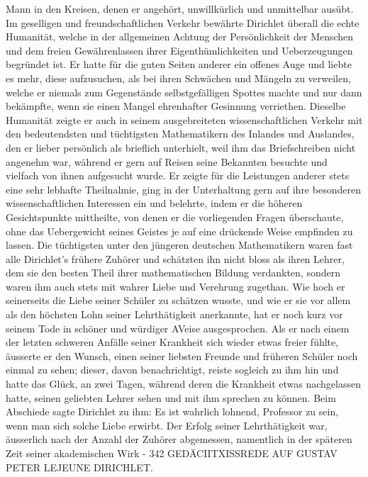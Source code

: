 \documentclass[11pt]{article}
\begin{document}
\noindent Mann in den Kreisen, denen er angehört, unwillkürlich und unmittelbar ausübt. Im geselligen und freundschaftlichen Verkehr bewährte Dirichlet überall die echte Humanität, welche in der allgemeinen Achtung der Persönlichkeit der Menschen und dem freien Gewährenlassen ihrer Eigenthümlichkeiten und Ueberzeugungen begründet ist. Er hatte für die guten Seiten anderer ein offenes Auge und liebte es mehr, diese aufzusuchen, als bei ihren Schwächen und Mängeln zu verweilen, welche er niemals zum Gegenstände selbstgefälligen Spottes machte und nur dann bekämpfte, wenn sie einen Mangel ehrenhafter Gesinnung verriethen. Dieselbe Humanität zeigte er auch in seinem ausgebreiteten wissenschaftlichen Verkehr mit den bedeutendsten und tüchtigsten Mathematikern des Inlandes und Auslandes, den er lieber persönlich als brieflich unterhielt, weil ihm das Briefschreiben nicht angenehm war, während er gern auf Reisen seine Bekannten besuchte und vielfach von ihnen aufgesucht wurde. Er zeigte für die Leistungen anderer stets eine sehr lebhafte Theilnalmie, ging in der Unterhaltung gern auf ihre besonderen wissenschaftlichen Interessen ein und belehrte, indem er die höheren Gesichtspunkte mittheilte, von denen er die vorliegenden Fragen überschaute, ohne das Uebergewicht seines Geistes je auf eine drückende Weise empfinden zu lassen. Die tüchtigsten unter den jüngeren deutschen Mathematikern waren fast alle Dirichlet’s frühere Zuhörer und schätzten ihn nicht bloss als ihren Lehrer, dem sie den besten Theil ihrer mathematischen Bildung verdankten, sondern waren ihm auch stets mit wahrer Liebe und Verehrung zugethan. Wie hoch er seinerseits die Liebe seiner Schüler zu schätzen wusste, und wie er sie vor allem als den höchsten Lohn seiner Lehrthätigkeit anerkannte, hat er noch kurz vor seinem Tode in schöner und würdiger AVeise ausgesprochen. Als er nach einem der letzten schweren Anfälle seiner Krankheit sich wieder etwas freier fühlte, äusserte er den Wunsch, einen seiner liebsten Freunde und früheren Schüler noch einmal zu sehen; dieser, davon benachrichtigt, reiste sogleich zu ihm hin und hatte das Glück, an zwei Tagen, während deren die Krankheit etwas nachgelassen hatte, seinen geliebten Lehrer sehen und mit ihm sprechen zu können. Beim Abschiede sagte Dirichlet zu ihm: Es ist wahrlich lohnend, Professor zu sein, wenn man sich solche Liebe erwirbt. Der Erfolg seiner Lehrthätigkeit war, äusserlich nach der Anzahl der Zuhörer abgemessen, namentlich in der späteren Zeit seiner akademischen Wirk - 342 GEDÄCIITXISSREDE AUF GUSTAV PETER LEJEUNE DIRICHLET.
\par
\end{document}
